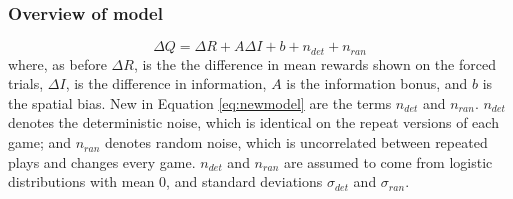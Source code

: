 \documentclass[12pt]{article}
\begin{document}
	\subsubsection*{Overview of model}
	\begin{equation}
    \label{eq:newmodel}
		\Delta Q= \Delta R+A \Delta I+b+n_{det}+n_{ran}
	\end{equation}
	where, as before $\Delta R$, is the the difference in mean rewards shown on the forced trials, $\Delta I$, is the difference in information, $A$ is the information bonus, and $b$ is the spatial bias.
    New in Equation \ref{eq:newmodel} are the terms $n_{det}$ and $n_{ran}$. $n_{det}$ denotes the deterministic noise, which is identical on the repeat versions of each game; and $n_{ran}$ denotes random noise, which is uncorrelated between repeated plays and changes every game. $n_{det}$ and $n_{ran}$ are assumed to come from logistic distributions with mean 0, and standard deviations $\sigma_{det}$ and $\sigma_{ran}$. 
    
\end{document}
